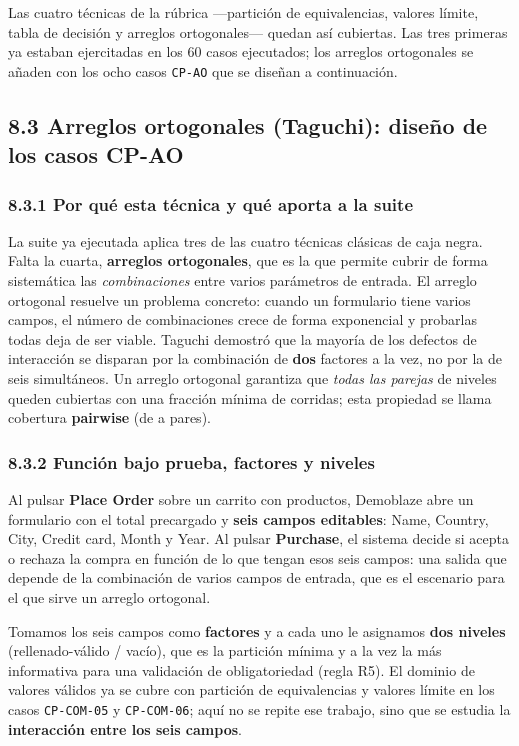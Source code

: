 Las cuatro técnicas de la rúbrica —partición de equivalencias, valores límite, tabla
de decisión y arreglos ortogonales— quedan así cubiertas. Las tres primeras ya
estaban ejercitadas en los 60 casos ejecutados; los arreglos ortogonales se añaden con
los ocho casos \texttt{CP-AO} que se diseñan a continuación.

\subsection*{8.3 Arreglos ortogonales (Taguchi): diseño de los casos CP-AO}

\subsubsection*{8.3.1 Por qué esta técnica y qué aporta a la suite}

La suite ya ejecutada aplica tres de las cuatro técnicas clásicas de caja negra. Falta
la cuarta, \textbf{arreglos ortogonales}, que es la que permite cubrir de forma
sistemática las \emph{combinaciones} entre varios parámetros de entrada. El arreglo
ortogonal resuelve un problema concreto: cuando un formulario tiene varios campos, el
número de combinaciones crece de forma exponencial y probarlas todas deja de ser
viable. Taguchi demostró que la mayoría de los defectos de interacción se disparan por
la combinación de \textbf{dos} factores a la vez, no por la de seis simultáneos. Un
arreglo ortogonal garantiza que \emph{todas las parejas} de niveles queden cubiertas
con una fracción mínima de corridas; esta propiedad se llama cobertura \textbf{pairwise}
(de a pares).

\subsubsection*{8.3.2 Función bajo prueba, factores y niveles}

Al pulsar \textbf{Place Order} sobre un carrito con productos, Demoblaze abre un
formulario con el total precargado y \textbf{seis campos editables}: Name, Country,
City, Credit card, Month y Year. Al pulsar \textbf{Purchase}, el sistema decide si
acepta o rechaza la compra en función de lo que tengan esos seis campos: una salida
que depende de la combinación de varios campos de entrada, que es el escenario para el
que sirve un arreglo ortogonal.

Tomamos los seis campos como \textbf{factores} y a cada uno le asignamos \textbf{dos
niveles} (rellenado-válido / vacío), que es la partición mínima y a la vez la más
informativa para una validación de obligatoriedad (regla R5). El dominio de valores
válidos ya se cubre con partición de equivalencias y valores límite en los casos
\texttt{CP-COM-05} y \texttt{CP-COM-06}; aquí no se repite ese trabajo, sino que se
estudia la \textbf{interacción entre los seis campos}.

